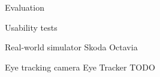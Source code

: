 \chap Evaluation

\sec Usability tests

\secc Real-world simulator Skoda Octavia

\secc Eye tracking camera Eye Tracker TODO
